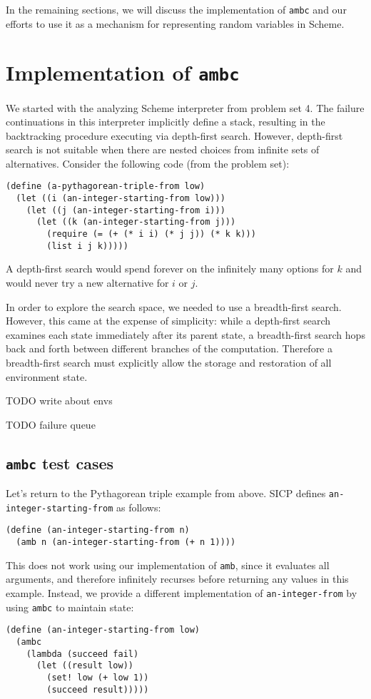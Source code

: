 \documentclass{article}
\begin{document}
In the remaining sections, we will discuss the implementation of
\texttt{ambc} and our efforts to use it as a mechanism for
representing random variables in Scheme.

\section{Implementation of \texttt{ambc}}

We started with the analyzing Scheme interpreter from problem set 4.  The
failure continuations in this interpreter implicitly define a stack, resulting
in the backtracking procedure executing via depth-first search.  However,
depth-first search is not suitable when there are nested choices from infinite
sets of alternatives. Consider the following code (from the problem set):
\begin{lstlisting}
(define (a-pythagorean-triple-from low)
  (let ((i (an-integer-starting-from low)))
    (let ((j (an-integer-starting-from i)))
      (let ((k (an-integer-starting-from j)))
        (require (= (+ (* i i) (* j j)) (* k k)))
        (list i j k)))))
\end{lstlisting}
A depth-first search would spend forever on the infinitely many options for $k$
and would never try a new alternative for $i$ or $j$.

In order to explore the search space, we needed to use a breadth-first
search.  However, this came at the expense of simplicity: while a
depth-first search examines each state immediately after its parent
state, a breadth-first search hops back and forth between different
branches of the computation.  Therefore a breadth-first search must
explicitly allow the storage and restoration of all environment state.

TODO write about envs

TODO failure queue

\subsection{\texttt{ambc} test cases}

Let's return to the Pythagorean triple example from above. SICP defines
\texttt{an-integer-starting-from} as follows:
\begin{lstlisting}
(define (an-integer-starting-from n)
  (amb n (an-integer-starting-from (+ n 1))))
\end{lstlisting}
This does not work using our implementation of \texttt{amb}, since it evaluates
all arguments, and therefore infinitely recurses before returning any values in
this example. Instead, we provide a different implementation of
\texttt{an-integer-from} by using \texttt{ambc} to maintain state:
\begin{lstlisting}
(define (an-integer-starting-from low)
  (ambc
    (lambda (succeed fail)
      (let ((result low))
        (set! low (+ low 1))
        (succeed result)))))
\end{lstlisting}
\end{document}
